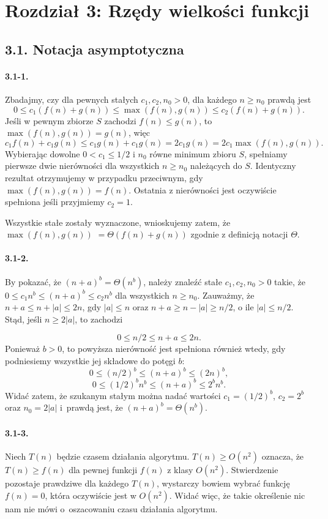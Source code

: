 \section*{Rozdział 3: Rzędy wielkości funkcji}

\subsection*{3.1. Notacja asymptotyczna}

\paragraph{3.1-1.}
Zbadajmy, czy dla pewnych stałych $c_1,c_2,n_0>0$, dla każdego $n\ge n_0$ prawdą jest
\[
  0\le c_1(f(n)+g(n))\le\max(f(n),g(n))\le c_2(f(n)+g(n)).
\]
Jeśli w pewnym zbiorze $S$ zachodzi $f(n)\le g(n)$, to $\max(f(n), g(n)) = g(n)$, więc
\[
  c_1f(n)+c_1g(n)\le c_1g(n)+c_1g(n) = 2c_1g(n) = 2c_1\max(f(n), g(n)).
\]
Wybierając dowolne $0<c_1\le 1/2$ i $n_0$ równe minimum zbioru $S$, spełniamy pierwsze dwie nierówności dla wszystkich $n\ge n_0$ należących do $S$. Identyczny rezultat otrzymujemy w przypadku przeciwnym, gdy $\max(f(n), g(n)) = f(n)$. Ostatnia z nierówności jest oczywiście spełniona jeśli przyjmiemy $c_2=1$.

Wszystkie stałe zostały wyznaczone, wnioskujemy zatem, że $\max(f(n), g(n))$ $= \Theta(f(n)+g(n))$ zgodnie z definicją notacji $\Theta$.

\paragraph{3.1-2.}
By pokazać, że $(n+a)^b=\Theta(n^b)$, należy znaleźć stałe $c_1,c_2,n_0>0$ takie, że $0\le c_1n^b\le (n+a)^b\le c_2n^b$ dla wszystkich $n\ge n_0$. Zauważmy, że $n+a\le n+|a|\le 2n$, gdy $|a|\le n$ oraz $n+a\ge n-|a|\ge n/2$, o ile $|a|\le n/2$. Stąd, jeśli $n\ge 2|a|$, to zachodzi

\[
  0\le n/2\le n+a\le 2n.
\]
Ponieważ $b>0$, to powyższa nierówność jest spełniona również wtedy, gdy podniesiemy wszystkie jej składowe do potęgi $b$:
\[
  0\le (n/2)^b\le (n+a)^b\le (2n)^b,
\]
\[
  0\le (1/2)^bn^b\le (n+a)^b\le 2^bn^b.
\]
Widać zatem, że szukanym stałym można nadać wartości $c_1=(1/2)^b$, $c_2=2^b$ oraz $n_0=2|a|$ i~prawdą jest, że $(n+a)^b=\Theta(n^b)$.

\paragraph{3.1-3.}
Niech $T(n)$ będzie czasem działania algorytmu. $T(n)\ge O(n^2)$ oznacza, że $T(n)\ge f(n)$ dla pewnej funkcji $f(n)$ z klasy $O(n^2)$. Stwierdzenie pozostaje prawdziwe dla każdego $T(n)$, wystarczy bowiem wybrać funkcję $f(n)=0$, która oczywiście jest w $O(n^2)$. Widać więc, że takie określenie nic nam nie mówi o~oszacowaniu czasu działania algorytmu.

